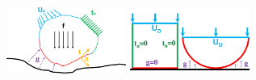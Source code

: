 \documentclass[8pt, oneside]{beamer}   	%
\begin{document}
\begin{frame}
\begin{align*}
\end{align*}
\begin{figure}[htbp!]
		\centering
	\includegraphics[width=0.35\textwidth]{img/contactproblem.pdf}\qquad
	\includegraphics[width=0.35\textwidth]{img/squarecircle.pdf}
		\label{abb_arc}
\end{figure}
\end{frame}


\end{document}
